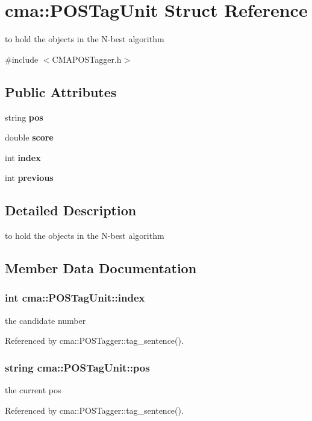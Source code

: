 \section{cma::POSTagUnit Struct Reference}
\label{structcma_1_1POSTagUnit}


to hold the objects in the N-\/best algorithm  


{\ttfamily \#include $<$CMAPOSTagger.h$>$}\subsection*{Public Attributes}
\begin{DoxyCompactItemize}
\item 
string {\bf pos}
\item 
double {\bf score}
\item 
int {\bf index}
\item 
int {\bf previous}
\end{DoxyCompactItemize}


\subsection{Detailed Description}
to hold the objects in the N-\/best algorithm 

\subsection{Member Data Documentation}
\subsubsection[{index}]{\setlength{\rightskip}{0pt plus 5cm}int {\bf cma::POSTagUnit::index}}\label{structcma_1_1POSTagUnit_a982a3b0932a72ce0a96de0bb24f6d849}
the candidate number 

Referenced by cma::POSTagger::tag\_\-sentence().
\subsubsection[{pos}]{\setlength{\rightskip}{0pt plus 5cm}string {\bf cma::POSTagUnit::pos}}\label{structcma_1_1POSTagUnit_a695dce4497a36b42431d5506fdccf30e}
the current pos 

Referenced by cma::POSTagger::tag\_\-sentence().
